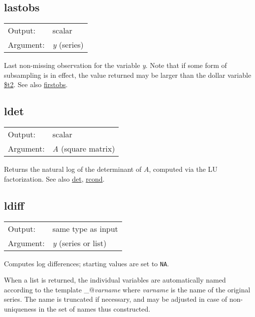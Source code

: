 \subsection{lastobs}
\hypertarget{func-lastobs}{}

\begin{tabular}{ll}
Output:     & scalar\\
Argument:   & \textsl{y} (series)\\
\end{tabular}

	  Last non-missing observation for the variable
	  \textsl{y}. Note that if some form of subsampling is
	  in effect, the value returned may be larger than the dollar
	  variable \hyperlink{func-dolt2}{\$t2}.
	  See also \hyperlink{func-firstobs}{firstobs}.

\subsection{ldet}
\hypertarget{func-ldet}{}

\begin{tabular}{ll}
Output:     & scalar\\
Argument:   & \textsl{A} (square matrix)\\
\end{tabular}

	  Returns the natural log of the determinant of \ensuremath{A},
	  computed via the LU factorization.
	  See also \hyperlink{func-det}{det}, \hyperlink{func-rcond}{rcond}.

\subsection{ldiff}
\hypertarget{func-ldiff}{}

\begin{tabular}{ll}
Output:     & same type as input\\
Argument:   & \textsl{y} (series or list)\\
\end{tabular}

	  Computes log differences; starting values are set to
	  \texttt{NA}.

	  When a list is returned, the individual variables are
	  automatically named according to the template
	  \verb@ld_@\textsl{varname} where \textsl{varname} is the
	  name of the original series.  The name is truncated if necessary,
	  and may be adjusted in case of non-uniqueness in the set of names
	  thus constructed.

